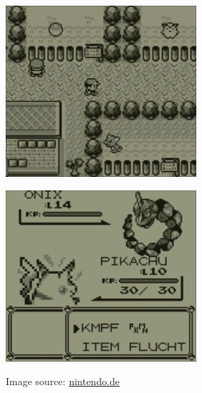 \begin{figure}[ht]
  \centering
  \begin{minipage}{.5\textwidth}
    \centering
    \includegraphics[width=.95\linewidth]{images/Red-0.jpg}
    \label{fig:red0}
  \end{minipage}%
  \begin{minipage}{.5\textwidth}
    \centering
    \includegraphics[width=.95\linewidth]{images/Red-1.jpg}
    \label{fig:red1}
  \end{minipage}
  \caption*{Image source: \href{https://www.nintendo.de/Spiele/Game-Boy/Pokemon-Rote-Edition-266109.html}{nintendo.de}}
\end{figure}
